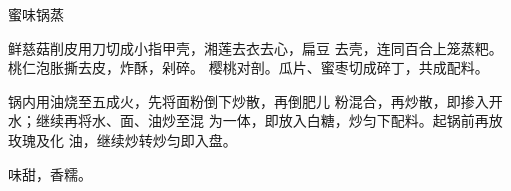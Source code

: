 \begin{recipe}[八宝锅蒸]{蜜味锅蒸}

\ingredients


\cooking

\step 鲜慈菇削皮用刀切成小指甲壳，湘莲去衣去心，扁豆 去壳，连同百合上笼蒸粑。桃仁泡胀撕去皮，炸酥，剁碎。 樱桃对剖。瓜片、蜜枣切成碎丁，共成配料。

\step 锅内用油烧至五成火，先将面粉倒下炒散，再倒肥儿 粉混合，再炒散，即掺入开水；继续再将水、面、油炒至混 为一体，即放入白糖，炒匀下配料。起锅前再放玫瑰及化 油，继续炒转炒匀即入盘。

\notes

味甜，香糯。

\end{recipe}

